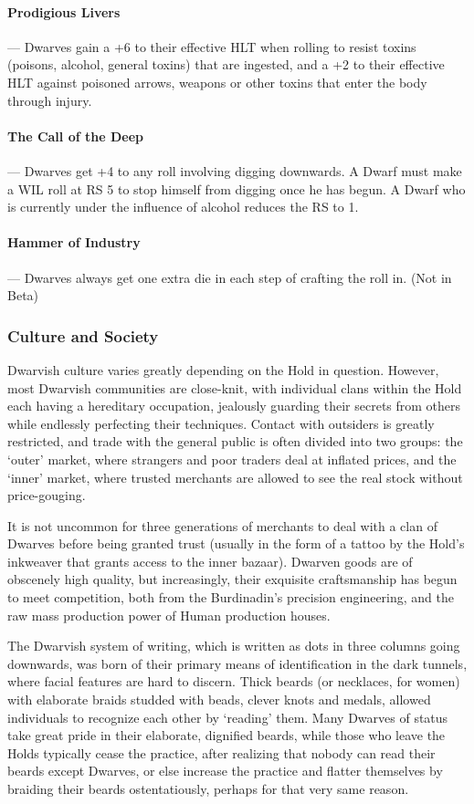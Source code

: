 \documentclass[oneside,11pt,english]{book}
\begin{document}
\paragraph{Prodigious Livers}---\quad
Dwarves gain a +6 to their effective HLT when rolling to resist toxins (poisons, alcohol, general toxins) that are ingested, and a +2 to their effective HLT against poisoned arrows, weapons or other toxins that enter the body through injury.
\paragraph{The Call of the Deep}---\quad
Dwarves get +4 to any roll involving digging downwards. A Dwarf must make a WIL roll at RS 5 
to stop himself from digging once he has begun. A Dwarf who is currently under the influence of 
alcohol reduces the RS to 1. 
\paragraph{Hammer of Industry}---\quad
Dwarves always get one extra die in each step of crafting the roll in. (Not in Beta) 
\subsubsection*{Culture and Society}
Dwarvish culture varies greatly depending on the Hold in question. However, most Dwarvish 
communities are close-knit, with individual clans within the Hold each having a hereditary occupation, 
jealously guarding their secrets from others while endlessly perfecting their techniques. Contact with 
outsiders is greatly restricted, and trade with the general public is often divided into two groups: the 
‘outer’ market, where strangers and poor traders deal at inflated prices, and the ‘inner’ market, where 
trusted merchants are allowed to see the real stock without price-gouging. 


It is not uncommon for three generations of merchants to deal with a clan of Dwarves before being 
granted trust (usually in the form of a tattoo by the Hold's inkweaver that grants access to the inner 
bazaar). Dwarven goods are of obscenely high quality, but increasingly, their exquisite craftsmanship has 
begun to meet competition, both from the Burdinadin's precision engineering, and the raw mass 
production power of Human production houses. 

 
The Dwarvish system of writing, which is written as dots in three columns going downwards, was born of 
their primary means of identification in the dark tunnels, where facial features are hard to discern. Thick 
beards (or necklaces, for women) with elaborate braids studded with beads, clever knots and medals, 
allowed individuals to recognize each other by ‘reading’ them. Many Dwarves of status take great pride 
in their elaborate, dignified beards, while those who leave the Holds typically cease the practice, after 
realizing that nobody can read their beards except Dwarves, or else increase the practice and flatter 
themselves by braiding their beards ostentatiously, perhaps for that very same reason. 
\end{document}
